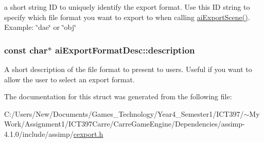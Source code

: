 a short string ID to uniquely identify the export format. Use this ID string to specify which file format you want to export to when calling \hyperlink{cexport_8h_9615510b8430a9da4f435a72148128dd}{aiExportScene()}. Example: \char`\"{}dae\char`\"{} or \char`\"{}obj\char`\"{} \hypertarget{structai_export_format_desc_9c84c4b07c5177fb6539b9bdf90236fb}{
\subsubsection[description]{\setlength{\rightskip}{0pt plus 5cm}const char$\ast$ {\bf aiExportFormatDesc::description}}}
\label{structai_export_format_desc_9c84c4b07c5177fb6539b9bdf90236fb}


A short description of the file format to present to users. Useful if you want to allow the user to select an export format. 

The documentation for this struct was generated from the following file:\begin{CompactItemize}
\item 
C:/Users/New/Documents/Games\_\-Technology/Year4\_\-Semester1/ICT397/$\sim$My Work/Assignment1/ICT397Carre/CarreGameEngine/Dependencies/assimp-4.1.0/include/assimp/\hyperlink{cexport_8h}{cexport.h}\end{CompactItemize}
